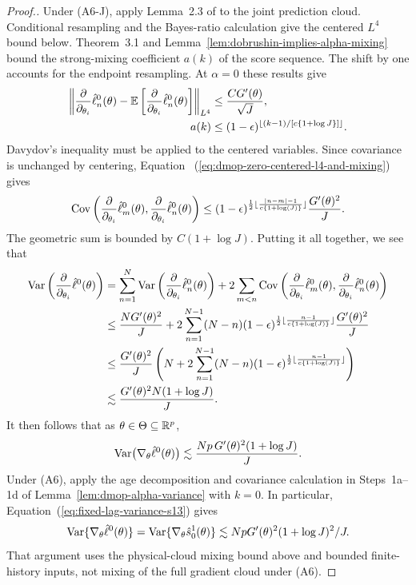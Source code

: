 \begin{proof}[Proof.]
Under (A6-J), apply Lemma~2.3 of \citet{karjalainen23} to the joint
prediction cloud. Conditional resampling and the Bayes-ratio calculation
give the centered $L^4$ bound below. Theorem~3.1 and Lemma~\ref{lem:dobrushin-implies-alpha-mixing} bound the
strong-mixing coefficient $a(k)$ of the score sequence. The shift by one
accounts for the endpoint resampling. At $\alpha=0$ these results give
\begin{align}
\left\|
\frac{\partial}{\partial_{\theta_i}}\hat\ell_n^0(\theta)
-\mathbb{E}\left[
\frac{\partial}{\partial_{\theta_i}}\hat\ell_n^0(\theta)
\right]
\right\|_{L^4}
&\leq
\frac{CG'(\theta)}{\sqrt J},                                \notag\\
a(k)
&\leq
(1-\epsilon)^{\lfloor (k-1)/[c\{1+\log J\}] \rfloor}.
\label{eq:dmop-zero-centered-l4-and-mixing}
\end{align}
Davydov's inequality must be applied to the centered variables. Since
covariance is unchanged by centering, Equation~
(\ref{eq:dmop-zero-centered-l4-and-mixing}) gives
\begin{equation}
\mathrm{Cov}\left(\frac{\partial}{\partial_{\theta_i}}\hat\ell_m^0(\theta), \frac{\partial}{\partial_{\theta_i}}\hat\ell_n^0(\theta)\right) \leq (1-\epsilon)^{\frac{1}{2}\lfloor \frac{|n-m|-1}{c\{1+\log(J)\}} \rfloor}\frac{G'(\theta)^2}{J}.
\end{equation}
The geometric sum is bounded by $C(1+\log J)$. Putting it all together, we see that
\begin{align}
    \mathrm{Var}\left(\frac{\partial}{\partial_{\theta_i}} \hat\ell^0(\theta)\right) &= \sum_{n=1}^N \mathrm{Var}\left(\frac{\partial}{\partial_{\theta_i}}\hat\ell_n^0(\theta)\right) + 2\sum_{m<n} \mathrm{Cov}\left(\frac{\partial}{\partial_{\theta_i}}\hat\ell_m^0(\theta),\frac{\partial}{\partial_{\theta_i}}\hat\ell_n^0(\theta)\right)\\
    &\leq \frac{NG'(\theta)^2}{J} + 2\sum_{n=1}^{N-1} (N-n)(1-\epsilon)^{\frac{1}{2}\lfloor \frac{n-1}{c\{1+\log(J)\}} \rfloor}\frac{G'(\theta)^2}{J} \\
    &\leq \frac{G'(\theta)^2}{J} \left(N + 2\sum_{n=1}^{N-1} (N-n) (1-\epsilon)^{\frac{1}{2}\lfloor \frac{n-1}{c\{1+\log(J)\}} \rfloor}\right) \\
    &\lesssim \frac{G'(\theta)^2N(1+\log J)}{J}.
\end{align}
It then follows that as $\theta \in \Theta \subseteq {\mathbb{R}}^p$, 
\begin{equation}
    \mathrm{Var}\big(\nabla_{\theta} \hat\ell^0(\theta)\big) \lesssim \frac{Np \, G'(\theta)^2(1+\log J)}{J}.
\end{equation}
Under (A6), apply the age decomposition and covariance calculation in
Steps~1a--1d of Lemma~\ref{lem:dmop-alpha-variance} with $k=0$.
In particular, Equation~(\ref{eq:fixed-lag-variance-s13}) gives
\[
\mathrm{Var}\{\nabla_\theta\hat\ell^0(\theta)\}
=\mathrm{Var}\{\nabla_\theta\hat s_0^1(\theta)\}
\lesssim NpG'(\theta)^2(1+\log J)^2/J.
\]
That argument uses the physical-cloud mixing bound above and bounded
finite-history inputs, not mixing of the full gradient cloud under (A6).
\end{proof}
